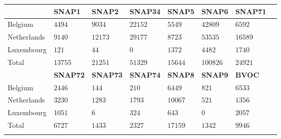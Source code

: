 \begin{tabular}{llllllll}
    \hline \hline
    & \textbf{SNAP1} & \textbf{SNAP2} & \textbf{SNAP34} & \textbf{SNAP5} & \textbf{SNAP6} & \textbf{SNAP71} \\
    \hline
    Belgium & $4494$ & $9034$ & $22152$ & $5549$ & $42809$ & $6592$ \\
    Netherlands & $9140$ & $12173$ & $29177$ & $8723$ & $53535$ & $16589$ \\
    Luxembourg & $121$ & $44$ & $0$ & $1372$ & $4482$ & $1740$ \\
    \hline
    Total & $13755$ & $21251$ & $51329$ & $15644$ & $100826$ & $24921$ \\
    \hline
    & \textbf{SNAP72} & \textbf{SNAP73} & \textbf{SNAP74} & \textbf{SNAP8} & \textbf{SNAP9} & \textbf{BVOC} \\
    \hline
    Belgium & $2446$ & $144$ & $210$ & $6449$ & $821$ & $6533$ \\
    Netherlands & $3230$ & $1283$ & $1793$ & $10067$ & $521$ & $1356$ \\
    Luxembourg & $1051$ & $6$ & $324$ & $643$ & $0$ & $2057$ \\
    \hline
    Total & $6727$ & $1433$ & $2327$ & $17159$ & $1342$ & $9946$ \\
    \hline \hline
    \label{t:NMVOC_emissions}%
\end{tabular}%
